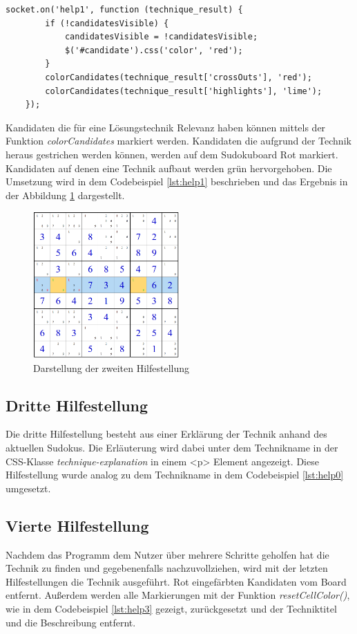 \begin{lstlisting}[caption={Zweite Hilfestellung}, label={lst:help1}]
	socket.on('help1', function (technique_result) {
		if (!candidatesVisible) {
			candidatesVisible = !candidatesVisible;
			$('#candidate').css('color', 'red');
		}
		colorCandidates(technique_result['crossOuts'], 'red');
		colorCandidates(technique_result['highlights'], 'lime');
	});

\end{lstlisting}

Kandidaten die für eine Lösungstechnik Relevanz haben können mittels der Funktion \textit{colorCandidates} markiert werden. Kandidaten die aufgrund der Technik heraus gestrichen werden können, werden auf dem Sudokuboard Rot markiert. Kandidaten auf denen eine Technik aufbaut werden grün hervorgehoben. Die Umsetzung wird in dem Codebeispiel \ref{lst:help1} beschrieben und das Ergebnis in der Abbildung \ref{fig:Help2} dargestellt.

\begin{figure}[htbp]
	\centering
	\includegraphics[width=0.5\textwidth]{images/Help2.png}
	\caption{Darstellung der zweiten Hilfestellung}
	\label{fig:Help2}
\end{figure}

\subsection{Dritte Hilfestellung}
Die dritte Hilfestellung besteht aus einer Erklärung der Technik anhand des aktuellen Sudokus. Die Erläuterung wird dabei unter dem Technikname in der CSS-Klasse \textit{technique-explanation} in einem <p> Element angezeigt. Diese Hilfestellung wurde analog zu dem Technikname in dem Codebeispiel \ref{lst:help0} umgesetzt.

\subsection{Vierte Hilfestellung}
Nachdem das Programm dem Nutzer über mehrere Schritte geholfen hat die Technik zu finden und gegebenenfalls nachzuvollziehen, wird mit der letzten Hilfestellungen die Technik ausgeführt. Rot eingefärbten Kandidaten vom Board entfernt. Außerdem werden alle Markierungen mit der Funktion \textit{resetCellColor()}, wie in dem Codebeispiel \ref{lst:help3} gezeigt, zurückgesetzt und der Techniktitel und die Beschreibung entfernt. 

